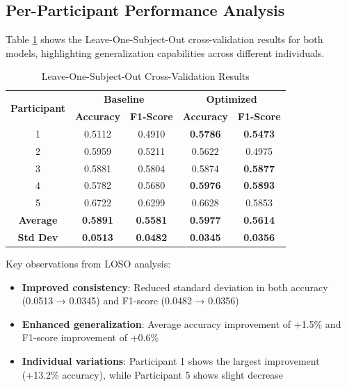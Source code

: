 \documentclass[a4paper,11pt]{article}
\begin{document}
\subsection{Per-Participant Performance Analysis}

Table \ref{tab:loso_results} shows the Leave-One-Subject-Out cross-validation results for both models, highlighting generalization capabilities across different individuals.

\begin{table}[H]
\centering
\caption{Leave-One-Subject-Out Cross-Validation Results}
\label{tab:loso_results}
\begin{tabular}{ccccc}
\toprule
\multirow{2}{*}{\textbf{Participant}} & \multicolumn{2}{c}{\textbf{Baseline}} & \multicolumn{2}{c}{\textbf{Optimized}} \\
\cmidrule(lr){2-3} \cmidrule(lr){4-5}
& \textbf{Accuracy} & \textbf{F1-Score} & \textbf{Accuracy} & \textbf{F1-Score} \\
\midrule
1 & 0.5112 & 0.4910 & \textcolor{improvement}{\textbf{0.5786}} & \textcolor{improvement}{\textbf{0.5473}} \\
2 & 0.5959 & 0.5211 & 0.5622 & 0.4975 \\
3 & 0.5881 & 0.5804 & 0.5874 & \textcolor{improvement}{\textbf{0.5877}} \\
4 & 0.5782 & 0.5680 & \textcolor{improvement}{\textbf{0.5976}} & \textcolor{improvement}{\textbf{0.5893}} \\
5 & 0.6722 & 0.6299 & 0.6628 & 0.5853 \\
\midrule
\textbf{Average} & \textbf{0.5891} & \textbf{0.5581} & \textcolor{improvement}{\textbf{0.5977}} & \textcolor{improvement}{\textbf{0.5614}} \\
\textbf{Std Dev} & \textbf{0.0513} & \textbf{0.0482} & \textcolor{improvement}{\textbf{0.0345}} & \textcolor{improvement}{\textbf{0.0356}} \\
\bottomrule
\end{tabular}
\end{table}

Key observations from LOSO analysis:
\begin{itemize}
\item \textcolor{improvement}{\textbf{Improved consistency}}: Reduced standard deviation in both accuracy (0.0513 → 0.0345) and F1-score (0.0482 → 0.0356)
\item \textcolor{improvement}{\textbf{Enhanced generalization}}: Average accuracy improvement of +1.5\% and F1-score improvement of +0.6\%
\item \textbf{Individual variations}: Participant 1 shows the largest improvement (+13.2\% accuracy), while Participant 5 shows slight decrease
\end{itemize}
\end{document}
